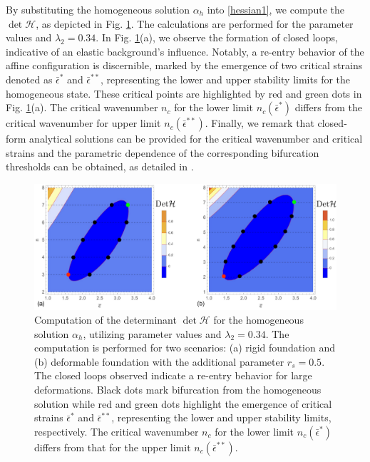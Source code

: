 By substituting the homogeneous solution $\alpha_h$ into \eqref{hessian1}, we compute  the $\det \mathcal{H}$, as depicted  in Fig. \ref{fig:hessian1}. The calculations are performed for the parameter values  and $\lambda_2=0.34$.  In Fig. \ref{fig:hessian1}(a), we observe the formation of closed loops, indicative of an elastic background's influence. Notably, a re-entry behavior of the affine configuration is discernible, marked by the emergence of two critical strains denoted as $\bar\epsilon^*$ and $\bar\epsilon^{**}$, representing the lower and upper stability limits for the homogeneous state. These critical points are highlighted by red and green dots in Fig. \ref{fig:hessian1}(a). The critical wavenumber $n_c$ for the lower limit $n_c(\bar{\epsilon}^*)$    differs from the critical wavenumber for  upper limit $n_c(\bar{\epsilon}^{**})$. Finally, we remark that closed-form analytical solutions can be provided for the critical wavenumber and critical strains and the parametric dependence of the corresponding bifurcation thresholds can be obtained, as detailed in \cite{Salman2021-mn}.


\begin{figure}
     \centering
     \includegraphics[scale=0.25]{./final_images/fig1.pdf}
\caption{
Computation of the determinant $\det \mathcal{H}$ for the homogeneous solution $\alpha_h$, utilizing parameter values  and $\lambda_2 = 0.34$. The computation is performed for two scenarios: (a) rigid foundation and (b) deformable foundation with the additional parameter $r_s=0.5$. The closed loops observed indicate a re-entry behavior for large deformations. Black dots mark bifurcation from the homogeneous solution while red and green dots highlight the emergence of critical strains $\bar{\epsilon}^*$ and $\bar{\epsilon}^{**}$, representing the lower and upper stability limits, respectively. The critical wavenumber $n_c$ for the lower limit $n_c(\bar{\epsilon}^*)$ differs from that for the upper limit $n_c(\bar{\epsilon}^{**})$.}
     \label{fig:hessian1}
 \end{figure}


